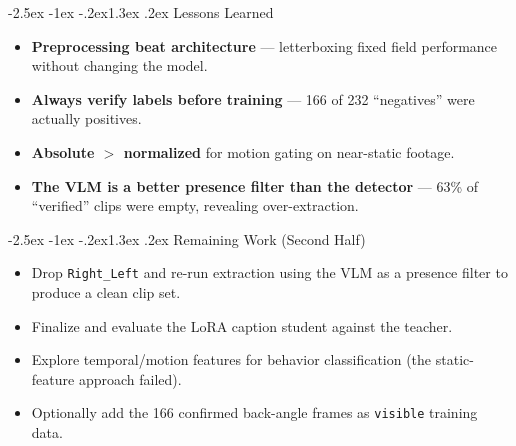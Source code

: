 \documentclass[11pt]{article}
\makeatletter
\renewcommand{\section}{\@startsection{section}{1}{\z@}%
  {-2.5ex \@plus -1ex \@minus -.2ex}{1.3ex \@plus.2ex}%
  {\normalfont\large\bfseries\color{accent}}}
\newcommand{\code}[1]{\texttt{\small #1}}
\makeatother
\begin{document}
\section{Lessons Learned}
\begin{itemize}
  \item \textbf{Preprocessing beat architecture} --- letterboxing fixed field performance without changing the model.
  \item \textbf{Always verify labels before training} --- 166 of 232 ``negatives'' were actually positives.
  \item \textbf{Absolute $>$ normalized} for motion gating on near-static footage.
  \item \textbf{The VLM is a better presence filter than the detector} --- 63\% of ``verified'' clips were empty, revealing over-extraction.
\end{itemize}

\section{Remaining Work (Second Half)}
\begin{itemize}
  \item Drop \code{Right\_Left} and re-run extraction using the VLM as a presence filter to produce a clean clip set.
  \item Finalize and evaluate the LoRA caption student against the teacher.
  \item Explore temporal/motion features for behavior classification (the static-feature approach failed).
  \item Optionally add the 166 confirmed back-angle frames as \code{visible} training data.
\end{itemize}
\end{document}
